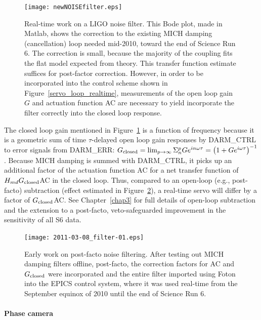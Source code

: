 	\begin{figure}
	\begin{center}
	\texttt{[image: newNOISEfilter.eps]}
	\caption{Real-time work on a LIGO noise filter. This Bode plot, made in Matlab, shows the correction to the existing MICH damping (cancellation) loop needed mid-2010, toward the end of Science Run 6. The correction is small, because the majority of the coupling fits the flat model expected from theory. This transfer function estimate suffices for post-factor correction. However, in order to be incorporated into the control scheme shown in Figure~\ref{servo_loop_realtime}, measurements of the open loop gain $G$ and actuation function AC are necessary to yield incorporate the filter correctly into the closed loop response.} 
	\label{newNOISEfilter}
	\end{center}
	\end{figure}

The closed loop gain mentioned in Figure~\ref{newNOISEfilter} is a function of frequency because it is a geometric sum of time $\tau$-delayed open loop gain responses by DARM\_CTRL to error signals from DARM\_ERR: $G_\textup{closed} = \lim_{p\rightarrow\infty} \Sigma_n^p G e^{i n \omega \tau} = \left(1 + G e^{i \omega \tau} \right)^{-1}$. 
Because MICH damping is summed with DARM\_CTRL, it picks up an additional factor of the actuation function AC for a net transfer function of $H_{md} G_\textup{closed}$AC in the closed loop. 
Thus, compared to an open-loop (e.g., post-facto) subtraction (effect estimated in Figure~\ref{filter_early}), a real-time servo will differ by a factor of $G_\textup{closed}$AC. 
See Chapter~\ref{chap3} for full details of open-loop subtraction and the extension to a post-facto, veto-safeguarded improvement in the sensitivity of all S6 data.

	\begin{figure}
	\begin{center}
	\texttt{[image: 2011-03-08\_filter-01.eps]}
	\caption{Early work on post-facto noise filtering. After testing out MICH damping filters offline, post-facto, the correction factors for AC and $G_\textup{closed}$ were incorporated and the entire filter imported using Foton into the EPICS control system, where it was used real-time from the September equinox of 2010 until the end of Science Run 6.}
	\label{filter_early}
	\end{center}
	\end{figure}

                \paragraph{Phase camera}
                \label{phase_camera}


